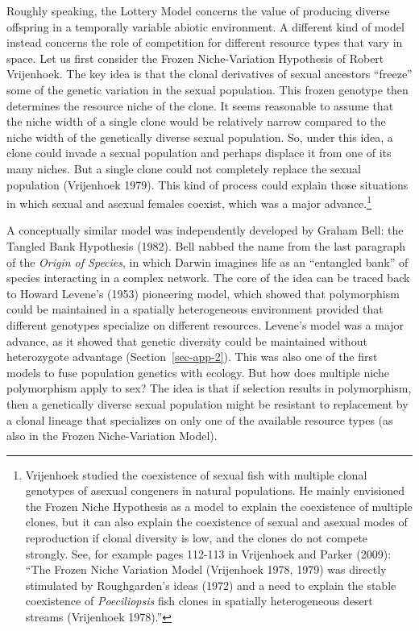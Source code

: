 \documentclass[
  letterpaper,
]{book}
\begin{document}
Roughly speaking, the Lottery Model concerns the value of producing
diverse offspring in a temporally variable abiotic environment. A
different kind of model instead concerns the role of competition for
different resource types that vary in space. Let us first consider the
Frozen Niche-Variation Hypothesis of Robert Vrijenhoek. The key idea is
that the clonal derivatives of sexual ancestors ``freeze'' some of the
genetic variation in the sexual population. This frozen genotype then
determines the resource niche of the clone. It seems reasonable to
assume that the niche width of a single clone would be relatively narrow
compared to the niche width of the genetically diverse sexual
population. So, under this idea, a clone could invade a sexual
population and perhaps displace it from one of its many niches. But a
single clone could not completely replace the sexual population
(Vrijenhoek 1979). This kind of process could explain those situations
in which sexual and asexual females coexist, which was a major
advance.\footnote{Vrijenhoek studied the coexistence of sexual fish with
  multiple clonal genotypes of asexual congeners in natural populations.
  He mainly envisioned the Frozen Niche Hypothesis as a model to explain
  the coexistence of multiple clones, but it can also explain the
  coexistence of sexual and asexual modes of reproduction if clonal
  diversity is low, and the clones do not compete strongly. See, for
  example pages 112-113 in Vrijenhoek and Parker (2009): ``The Frozen
  Niche Variation Model (Vrijenhoek 1978, 1979) was directly stimulated
  by Roughgarden's ideas (1972) and a need to explain the stable
  coexistence of \emph{Poeciliopsis} fish clones in spatially
  heterogeneous desert streams (Vrijenhoek 1978).''}

A conceptually similar model was independently developed by Graham Bell:
the Tangled Bank Hypothesis (1982). Bell nabbed the name from the last
paragraph of the \emph{Origin of Species}, in which Darwin imagines life
as an ``entangled bank'' of species interacting in a complex network.
The core of the idea can be traced back to Howard Levene's (1953)
pioneering model, which showed that polymorphism could be maintained in
a spatially heterogeneous environment provided that different genotypes
specialize on different resources. Levene's model was a major advance,
as it showed that genetic diversity could be maintained without
heterozygote advantage (Section~\ref{sec-app-2}). This was also one of
the first models to fuse population genetics with ecology. But how does
multiple niche polymorphism apply to sex? The idea is that if selection
results in polymorphism, then a genetically diverse sexual population
might be resistant to replacement by a clonal lineage that specializes
on only one of the available resource types (as also in the Frozen
Niche-Variation Model).
\end{document}
